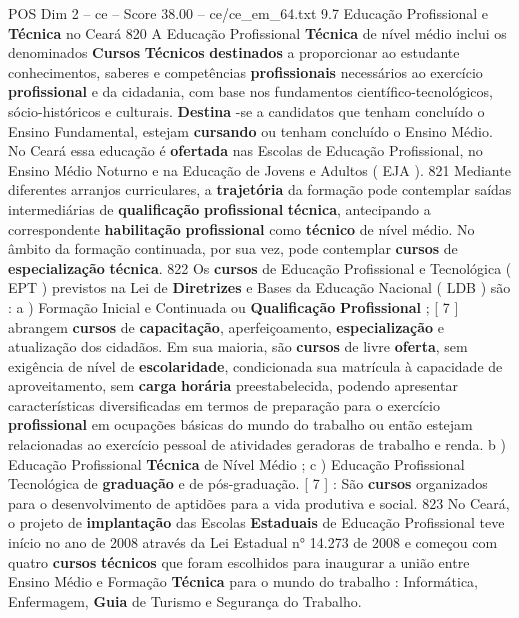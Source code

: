 \begin{textsample}{POS Dim 2 – ce – Score 38.00 – ce/ce\_em\_64.txt}  \label{ex:f2_pos_081}
9.7 Educação Profissional e \textbf{Técnica} no Ceará 820 A Educação Profissional \textbf{Técnica} de nível médio inclui os denominados \textbf{Cursos} \textbf{Técnicos} \textbf{destinados} a proporcionar ao estudante conhecimentos, saberes e competências \textbf{profissionais} necessários ao exercício \textbf{profissional} e da cidadania, com base nos fundamentos científico-tecnológicos, sócio-históricos e culturais. \textbf{Destina} -se a candidatos que tenham concluído o Ensino Fundamental, estejam \textbf{cursando} ou tenham concluído o Ensino Médio.
No Ceará essa educação é \textbf{ofertada} nas Escolas de Educação Profissional, no Ensino Médio Noturno e na Educação de Jovens e Adultos ( EJA ). 821 Mediante diferentes arranjos curriculares, a \textbf{trajetória} da formação pode contemplar saídas intermediárias de \textbf{qualificação} \textbf{profissional} \textbf{técnica}, antecipando a correspondente \textbf{habilitação} \textbf{profissional} como \textbf{técnico} de nível médio.
No âmbito da formação continuada, por sua vez, pode contemplar \textbf{cursos} de \textbf{especialização} \textbf{técnica}. 822 Os \textbf{cursos} de Educação Profissional e Tecnológica ( EPT ) previstos na Lei de \textbf{Diretrizes} e Bases da Educação Nacional ( LDB ) são : a ) Formação Inicial e Continuada ou \textbf{Qualificação} \textbf{Profissional} ; [ 7 ] abrangem \textbf{cursos} de \textbf{capacitação}, aperfeiçoamento, \textbf{especialização} e atualização dos cidadãos.
Em sua maioria, são \textbf{cursos} de livre \textbf{oferta}, sem exigência de nível de \textbf{escolaridade}, condicionada sua matrícula à capacidade de aproveitamento, sem \textbf{carga} \textbf{horária} preestabelecida, podendo apresentar características diversificadas em termos de preparação para o exercício \textbf{profissional} em ocupações básicas do mundo do trabalho ou então estejam relacionadas ao exercício pessoal de atividades geradoras de trabalho e renda. b ) Educação Profissional \textbf{Técnica} de Nível Médio ; c ) Educação Profissional Tecnológica de \textbf{graduação} e de pós-graduação. [ 7 ] : São \textbf{cursos} organizados para o desenvolvimento de aptidões para a vida produtiva e social. 823 No Ceará, o projeto de \textbf{implantação} das Escolas \textbf{Estaduais} de Educação Profissional teve início no ano de 2008 através da Lei Estadual n{\EmojiFont °} 14.273 de 2008 e começou com quatro \textbf{cursos} \textbf{técnicos} que foram escolhidos para inaugurar a união entre Ensino Médio e Formação \textbf{Técnica} para o mundo do trabalho : Informática, Enfermagem, \textbf{Guia} de Turismo e Segurança do Trabalho.

\end{textsample}

